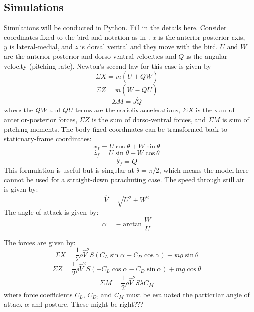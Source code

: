 \documentclass{rspublic}
\begin{document}
\subsection{Simulations}
Simulations will be conducted in Python.  Fill in the details here. Consider coordinates fixed to the bird and notation as in \citep{McCormick:1995, Anderson:2007}.  $x$ is the anterior-posterior axis, $y$ is lateral-medial, and $z$ is dorsal ventral and they move with the bird. $U$ and $W$ are the anterior-posterior and dorso-ventral velocities and $Q$ is the angular velocity (pitching rate).  Newton's second law for this case is given by
\begin{equation}
\Sigma X = m (\dot{U} + Q W)
\end{equation}
\begin{equation}
\Sigma Z = m (\dot{W} - Q U)
\end{equation}
\begin{equation}
\Sigma M = J \dot{Q}
\end{equation}
where the $QW$ and $QU$ terms are the coriolis accelerations, $\Sigma X$ is the sum of anterior-posterior forces, $\Sigma Z$ is the sum of dorso-ventral forces, and $\Sigma M$ is sum of pitching moments.  The body-fixed coordinates can be transformed back to stationary-frame coordinates:
\begin{equation}
\dot{x_f} = U \cos\theta + W \sin\theta
\end{equation}
\begin{equation}
\dot{z_f} = U \sin\theta - W \cos\theta
\end{equation}
\begin{equation}
\dot{\theta_f} = Q
\end{equation}
This formulation is useful but is singular at $\theta = \pi/2$, which means the model here cannot be used for a straight-down parachuting case.  The speed through still air is given by:
\begin{equation}
\hat V = \sqrt{U^2 + W^2}
\end{equation}
The angle of attack is given by:
\begin{equation}
\alpha = -\arctan{\frac{W}{U}}
\end{equation}

The forces are given by:
\begin{equation}
\Sigma X = \frac{1}{2}\rho\hat{V}^2 S (C_L \sin\alpha - C_D \cos\alpha) - m g \sin\theta
\end{equation}
\begin{equation}
\Sigma Z = \frac{1}{2}\rho\hat{V}^2 S (-C_L \cos\alpha - C_D \sin\alpha) + m g \cos\theta
\end{equation}
\begin{equation}
\Sigma M = \frac{1}{2}\rho\hat{V}^2 S\lambda C_M 
\end{equation}
where force coefficients $C_L$, $C_D$, and $C_M$ must be evaluated the particular angle of attack $\alpha$ and posture. These might be right???
\end{document}
